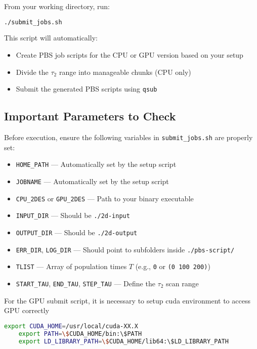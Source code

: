 \documentclass{article}
\begin{document}
From your working directory, run:

\begin{lstlisting}[language=bash]
./submit_jobs.sh
\end{lstlisting}

This script will automatically:
\begin{itemize}
    \item Create PBS job scripts for the CPU or GPU version based on your setup
    \item Divide the \(\tau_2\) range into manageable chunks (CPU only)
    \item Submit the generated PBS scripts using \texttt{qsub}
\end{itemize}

\subsection*{Important Parameters to Check}

Before execution, ensure the following variables in \texttt{submit\_jobs.sh} are properly set:

\begin{itemize}
    \item \texttt{HOME\_PATH} — Automatically set by the setup script
    \item \texttt{JOBNAME} — Automatically set by the setup script
    \item \texttt{CPU\_2DES} or \texttt{GPU\_2DES} — Path to your binary executable
    \item \texttt{INPUT\_DIR} — Should be \texttt{./2d-input}
    \item \texttt{OUTPUT\_DIR} — Should be \texttt{./2d-output}
    \item \texttt{ERR\_DIR}, \texttt{LOG\_DIR} — Should point to subfolders inside \texttt{./pbs-script/}
    \item \texttt{TLIST} — Array of population times \(T\) (e.g., \texttt{0} or \texttt{(0 100 200)})
    \item \texttt{START\_TAU}, \texttt{END\_TAU}, \texttt{STEP\_TAU} — Define the \(\tau_2\) scan range
\end{itemize}

For the GPU submit script, it is necessary to setup cuda environment to access GPU correctly
\begin{lstlisting}[language=bash]
    export CUDA_HOME=/usr/local/cuda-XX.X
    export PATH=\$CUDA_HOME/bin:\$PATH
    export LD_LIBRARY_PATH=\$CUDA_HOME/lib64:\$LD_LIBRARY_PATH
\end{lstlisting}
\end{document}
